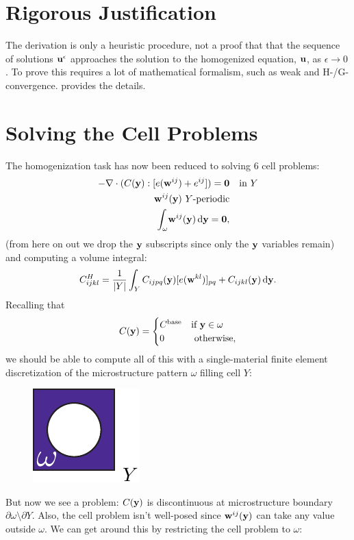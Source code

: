 \documentclass[10pt]{article}
\providecommand{\e}{\epsilon}
\begin{document}
\section{Rigorous Justification}
The derivation is only a heuristic procedure, not a proof that that the
sequence of solutions ${\bf u}^\e$ approaches the solution to the
homogenized equation, ${\bf u}$, as $\e \to 0$ . To prove this requires a lot of mathematical
formalism, such as weak and H-/G-convergence. \cite{allaire2002shape} provides the details.

\section{Solving the Cell Problems}
The homogenization task has now been reduced to solving 6 cell problems:
\begin{align*}
    -\nabla \cdot (C({\bf y}) : [e({\bf w}^{ij}) + e^{ij}]) = {\bf 0} & \quad \text{in } Y \\
    {\bf w}^{ij}({\bf y})\ Y \text{-periodic} & \\
    \int_\omega \! {\bf w}^{ij}({\bf y})  \, \mathrm{d} {\bf y} =  {\bf 0}, 
\end{align*}
(from here on out we drop the ${\bf y}$ subscripts since only the ${\bf y}$
variables remain) and computing a volume integral:
$$
C^H_{ijkl} = \frac{1}{|Y|} \int_Y C_{ijpq}({\bf y}) [e({\bf w}^{kl})]_{pq} + C_{ijkl}({\bf y}) \, \mathrm{d} {\bf y}.
$$
Recalling that 
$$
C ({\bf y}) = \begin{cases} C^\text{base} & \text{if } {\bf y} \in \omega \\
                                 0 & \text{ otherwise,} \end{cases}
$$
we should be able to compute all of this with a single-material finite element discretization
of the microstructure pattern $\omega$ filling cell $Y$:
\begin{figure}[H]
    \centering
    \includegraphics[width=.16\textwidth]{Images/cell.pdf}
\end{figure}
But now we see a problem: $C({\bf y})$ is discontinuous at microstructure boundary $\partial \omega \setminus \partial Y$. Also,
the cell problem isn't well-posed since ${\bf w}^{ij}({\bf y})$ can take any
value outside $\omega$. We can get around this by restricting the cell problem to $\omega$:
\end{document}
